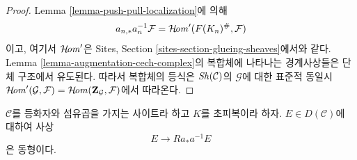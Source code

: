 \begin{proof}
Lemma \ref{lemma-push-pull-localization}에 의해
$$
a_{n, *}a_n^{-1}\mathcal{F} = \mathop{\mathcal{H}\!\mathit{om}}\nolimits'(F(K_n)^\#, \mathcal{F})
$$
이고, 여기서 $\mathop{\mathcal{H}\!\mathit{om}}\nolimits'$은 Sites, Section
\ref{sites-section-glueing-sheaves}에서와 같다.
Lemma \ref{lemma-augmentation-cech-complex}의 복합체에 나타나는
경계사상들은 단체 구조에서 유도된다. 따라서 복합체의 등식은
$\mathop{\mathit{Sh}}\nolimits(\mathcal{C})$의 $\mathcal{G}$에 대한 표준적 동일시
$\mathop{\mathcal{H}\!\mathit{om}}\nolimits'(\mathcal{G}, \mathcal{F}) =
\mathop{\mathcal{H}\!\mathit{om}}\nolimits(\mathbf{Z}_\mathcal{G}, \mathcal{F})$에서 따라온다.
\end{proof}

\begin{lemma}
\label{lemma-hypercovering-descent-bounded-abelian}
$\mathcal{C}$를 등화자와 섬유곱을 가지는 사이트라 하고 $K$를
초피복이라 하자. $E \in D(\mathcal{C})$에 대하여 사상
$$
E \longrightarrow Ra_*a^{-1}E
$$
은 동형이다.
\end{lemma}

